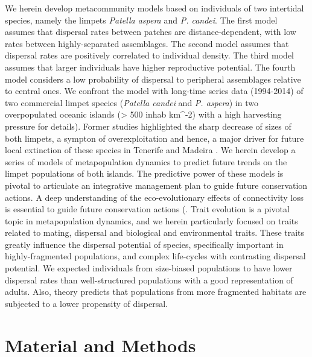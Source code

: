 \documentclass[12pt]{article}
\begin{document}
\begin{flushleft}
{{{{{We herein develop metacommunity models based on individuals of two intertidal species, namely the limpets \textit{Patella aspera} and \textit{P. candei}. The first model assumes that dispersal rates between patches are distance-dependent, with low rates between highly-separated assemblages. The second model assumes that dispersal rates are positively correlated to individual density. The third model assumes that larger individuals have higher reproductive potential. The fourth model considers a low probability of dispersal to peripheral assemblages relative to central ones. We confront the model with long-time series data (1994-2014) of two commercial limpet species (\textit{Patella candei} and \textit{P. aspera}) in two overpopulated oceanic islands (> 500 inhab km^{-2}) with a high harvesting pressure \citep{riera2016clear, sousa2019long} for details). Former studies highlighted the sharp decrease of sizes of both limpets, a sympton of overexploitation and hence, a major driver for future local extinction of these species in Tenerife \citep{riera2016clear} and Madeira \citep{sousa2019long}. We herein develop a series of models  of metapopulation dynamics to predict future trends on the limpet populations of both islands. The predictive power of these models is pivotal to articulate an integrative management plan to guide future conservation actions. A deep understanding of the eco-evolutionary effects of connectivity loss is essential to guide future conservation actions (\citep{travis2013dispersal, urban2001landscape}. Trait evolution is a pivotal topic in metapopulation dynamics, and we herein particularly focused on traits related to mating, dispersal and biological and environmental traits. These traits greatly influence the dispersal potential of species, specifically important in highly-fragmented populations, and complex life-cycles with contrasting dispersal potential.
We expected individuals from size-biased populations to have lower dispersal rates than well-structured populations with a good representation of adults. Also, theory predicts that populations from more fragmented habitats are subjected to a lower propensity of dispersal.

\section{Material and Methods}
}}}}}
\end{flushleft}
\end{document}
